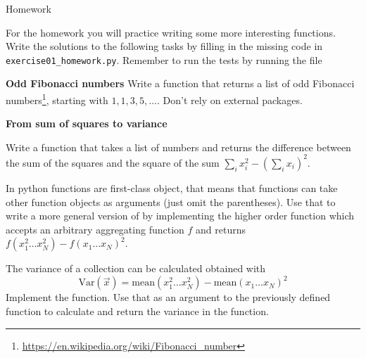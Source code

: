 \documentclass[a4paper, draft=False]{scrartcl}
\begin{document}
\newpage
\begin{exam}[Homework]{Homework}
  \begin{instructions}
    For the homework you will practice writing some more interesting functions.
    Write the solutions to the following tasks by filling in the missing code in
    \texttt{exercise01\_homework.py}. Remember to run the tests by running the file
  \end{instructions}

  \begin{problem}[4]\textbf{Odd Fibonacci numbers}
    Write a function  that returns a
    list of  odd Fibonacci
    numbers\footnote{\url{https://en.wikipedia.org/wiki/Fibonacci_number}},
    starting with $1, 1, 3, 5, \ldots$. Don't rely on external packages.
  \end{problem}
  \begin{problem*}[\auto]\textbf{From sum of squares to variance}
    \begin{parts}
     \item{} Write a function  that takes a list
       of numbers and returns the difference between the sum of the squares and
       the square of the sum $\sum_i x_i^2 - \left(\sum_i x_i\right)^2$.
     \item{} In python functions are first-class object, that means
       that functions can take other function objects as arguments (just omit
       the parentheses). Use that to write a more general version of
        by implementing the higher order function
        which accepts an arbitrary aggregating
       function $f$ and returns $f(x_1^2\ldots x_N^2) - f(x_1\ldots x_N)^2$.
     \item{} The variance of a collection can be calculated obtained with
       \begin{equation*}
       \mathrm{Var}(\vec{x}) = \mathrm{mean}(x_1^2\ldots x_N^2) - \mathrm{mean}(x_1\ldots x_N)^2\label{eq:1}
     \end{equation*}
     Implement the  function. Use that as an argument to the previously defined
      function to calculate and return the variance
     in the  function.
    \end{parts}
  \end{problem*}
\end{exam}
\end{document}
